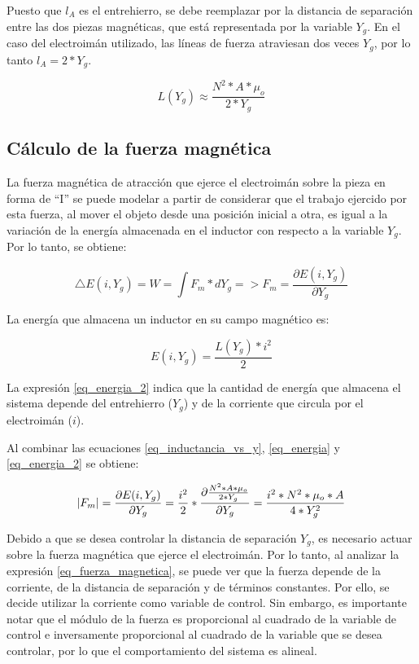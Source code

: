 \noindent \noindent Puesto que $l_{A}$ es el entrehierro, se debe reemplazar por la distancia de separación entre las dos piezas magnéticas, que está representada por la variable $Y_{g}$. En el caso del electroimán utilizado, las líneas de fuerza atraviesan dos veces $Y_{g}$, por lo tanto $l_{A}=2*Y_{g}$.


\begin{equation}\label{eq_inductancia_vs_y}
	L(Y_g)\approx\frac{{N^{2}*A*\mu_{o}}}{2*Y_{g}}
\end{equation}

\subsection{Cálculo de la fuerza magnética}\label{sec:fuerza_magnetica}

\noindent La fuerza magnética de atracción que ejerce el electroimán sobre la pieza en forma de ``I'' se puede modelar a partir de considerar que el trabajo ejercido por esta fuerza, al mover el objeto desde una posición inicial a otra, es igual a la variación de la energía almacenada en el inductor con respecto a la variable $Y_g$. Por lo tanto, se obtiene:

\begin{equation}\label{eq_energia}
	\triangle E(i,Y_g)=W=\int{F_{m}*dY_g}=>F_{m}=\frac{\partial{E(i,Y_g)}}{\partial{Y_g}}
\end{equation}

\noindent La energía que almacena un inductor en su campo magnético es:

\begin{equation}\label{eq_energia_2}
	E(i,Y_g)=\frac{L(Y_g)*i^{2}}{2}
\end{equation}

\noindent La expresión \ref{eq_energia_2} indica que la cantidad de energía que almacena el sistema depende del entrehierro ($Y_{g}$) y de la corriente que circula por el electroimán ($i$). 

\noindent Al combinar las ecuaciones \ref{eq_inductancia_vs_y}, \ref{eq_energia} y \ref{eq_energia_2} se obtiene:

\begin{equation}\label{eq_fuerza_magnetica}
	\lvert F_{m}\rvert=\frac{\partial{E(i,Y_g)}}{\partial{Y_g}}=\frac{i^{2}}{2}*\frac{\partial{\frac{{N^{2}*A*\mu_{o}}}{2*Y_{g}}}}{\partial{Y_g}}=\frac{i^{2}*N^{2}*\mu_{o}*A}{4*Y_{g}^{2}}
\end{equation}

Debido a que se desea controlar la distancia de separación $Y_g$, es necesario actuar sobre la fuerza magnética que ejerce el electroimán. Por lo tanto, al analizar la expresión \ref{eq_fuerza_magnetica}, se puede ver que la fuerza depende de la corriente, de la distancia de separación y de términos constantes. Por ello, se decide utilizar la corriente como variable de control. Sin embargo, es importante notar que el módulo de la fuerza es proporcional al cuadrado de la variable de control e inversamente proporcional al cuadrado de la variable que se desea controlar, por lo que el comportamiento del sistema es alineal.

